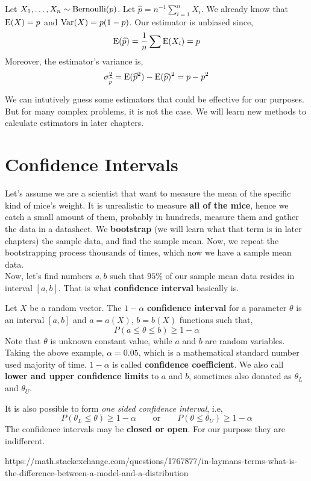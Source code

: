 \begin{example}
    Let $X_1, \ldots ,X_n \sim \operatorname{Bernoulli}(p)$. Let $\widehat{p} = n^{-1}\sum_{i=1}^n X_i$. We already know that ${\operatorname{E}}(X) = p$ and ${\operatorname{Var}}(X) = p(1-p)$.  Our estimator is unbiased since,
    \[ {\operatorname{E}}( \widehat{p}) = \frac{1}{n} \sum {\operatorname{E}}(X_i) = p\]
    Moreover, the estimator's variance is, 
    \[ \sigma_{\widehat{p}}^2 = {\operatorname{E}}(\widehat{p}^2) - {\operatorname{E}}(\widehat{p})^2 = p - p^2 \]
\end{example}
We can intutively guess some estimators that could be effective for our purposes. But for many complex problems, it is not the case. We will learn new methods to calculate estimators in later chapters.
\section{Confidence Intervals}
Let's assume we are a scientist that want to measure the mean of the specific kind of mice's weight.
It is unrealistic to measure \textbf{all of the mice}, hence we catch a small amount of them, probably in hundreds, measure them and gather the data in a datasheet. We \textbf{bootstrap} (we will learn what that term is in later chapters) the sample data, and find the sample mean. Now, we repeat the bootstrapping process thousands of times, which now we have a sample mean data.
\\
Now, let's find numbers $a,b$ such that $95\%$ of our sample mean data resides in interval $[a,b]$. That is what \textbf{confidence interval} basically is.
\begin{definition}
    Let $X$ be a random vector. The $1 - \alpha$ \textbf{confidence interval} for a parameter $\theta$ is an interval $[a,b]$ and $a = a(X)$, $b = b(X)$ functions such that,
    \[ P(a \le \theta \le b) \ge  1 - \alpha \]
    Note that $\theta$ is unknown constant value, while  $a$ and $b$ are random variables. 
   \\
   Taking the above example, $\alpha = 0.05$, which is a mathematical standard number used majority of time. $1 - \alpha$ is called \textbf{confidence coefficient}. We also call \textbf{lower and upper confidence limits} to $a$ and $b$, sometimes also donated as $\theta_{L}$ and $\theta_{U}$.
\end{definition}
It is also possible to form \textit{one sided confidence interval}, i.e,
\[ P( \theta_{L} \le \theta ) \ge 1 - \alpha  \qquad \text{or} \qquad P( \theta \le \theta_{U}) \ge 1 - \alpha\]
The confidence intervals may be \textbf{closed or open}. For our purpose they are indifferent. 

https://math.stackexchange.com/questions/1767877/in-laymans-terms-what-is-the-difference-between-a-model-and-a-distribution
